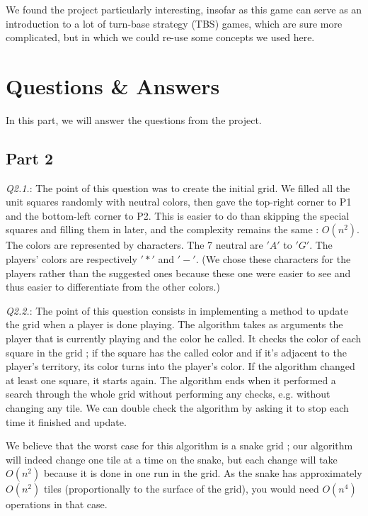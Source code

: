 \documentclass[a4paper]{article}
\begin{document}
We found the project particularly interesting, insofar as this game can serve as an introduction to a lot of turn-base strategy (TBS) games, which are sure more complicated, but in which we could re-use some concepts we used here.

\section{Questions \& Answers}
In this part, we will answer the questions from the project.

\subsection{Part 2}

\emph{Q2.1.}: The point of this question was to create the initial grid.
 We filled all the unit squares randomly with neutral colors, then gave the top-right corner to P1 and the bottom-left corner
  to P2. This is easier to do than skipping the special squares and filling them in later, and the complexity remains the same :
   $O(n^2)$. The colors are represented by characters. The 7 neutral are $'A'$ to $'G'$. The players' colors are respectively $'*'$ and $'-'$. \newline
   (We chose these characters for the players rather than the suggested ones because these one were easier to see and thus easier to differentiate from the other colors.)

\emph{Q2.2.}: The point of this question consists in implementing a method to update the grid when a player is done playing.
The algorithm takes as arguments the player that is currently playing and the color he called. 
It checks the color of each square in the grid ; if the square has the called color and if it's adjacent to the player's territory, its color turns into the player's color. If the algorithm changed at least one square, it starts again.
The algorithm ends when it performed a search through the whole grid without performing any checks, e.g. without changing any tile.
We can double check the algorithm by asking it to stop each time it finished and update.

We believe that the worst case for this algorithm is a snake grid ;
our algorithm will indeed change one tile at a time on the snake, but each change will take $O(n^2)$ because it is done in one run in the grid.
As the snake has approximately $O(n^2)$ tiles (proportionally to the surface of the grid), you would need $O(n^4)$ operations in that case.
\newline
\end{document}
